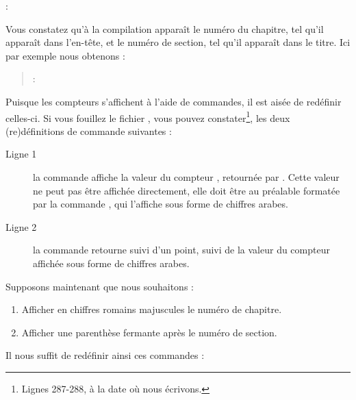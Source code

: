 \begin{latexcode}
\thechapter : \thesection
\end{latexcode}

Vous constatez qu'à la compilation apparaît le numéro du chapitre, tel qu'il apparaît dans l'en-tête, et le numéro de section, tel qu'il apparaît dans le titre. Ici par exemple nous obtenons :


\begin{quotation}
\thechapter : \thesection
\end{quotation}


Puisque les compteurs s'affichent à l'aide de commandes, il est aisée de redéfinir celles-ci. Si vous fouillez le fichier , vous pouvez constater\footnote{Lignes 287-288, à la date où nous écrivons.}, les deux (re)définitions de commande suivantes :

\begin{latexcode}
\renewcommand \thechapter {\@arabic\c@chapter}
\renewcommand \thesection {\thechapter.\@arabic\c@section}
\end{latexcode}

\begin{description}
\item[Ligne 1]la commande  affiche la valeur  du compteur , retournée par . Cette valeur ne peut pas être affichée directement, elle doit être au préalable formatée par la commande , qui l'affiche sous forme de chiffres arabes.
\item[Ligne 2]la commande  retourne  suivi d'un point, suivi de la valeur du compteur  affichée sous forme de chiffres arabes.
\end{description}

Supposons maintenant que nous souhaitons  :
\begin{enumerate}
\item Afficher en chiffres romains majuscules le numéro de chapitre.
\item Afficher une parenthèse fermante après le numéro de section.
\end{enumerate}

Il nous suffit de redéfinir ainsi ces commandes :

\begin{latexcode}
\renewcommand \thechapter {\@Roman\c@chapter}
\renewcommand \thesection {\thechapter.\@arabic\c@section)~}
\end{latexcode} 

